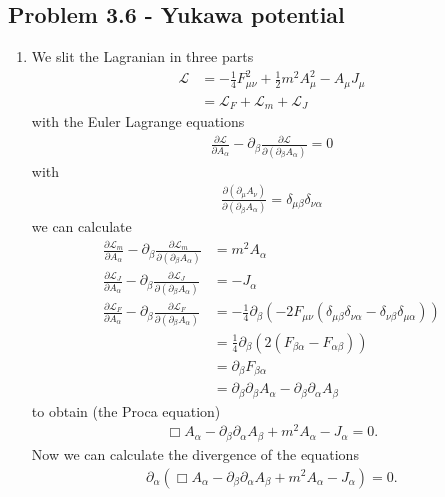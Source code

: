 \documentclass[../main.tex]{subfiles}
\begin{document}
\subsection{Problem 3.6 - Yukawa potential}
\begin{enumerate}[label=(\alph*)]
\item We slit the Lagranian in three parts
\begin{align}
\mathscr{L}&=-\frac{1}{4}F_{\mu\nu}^2+\frac{1}{2}m^2A_\mu^2-A_\mu J_\mu\\
&=\mathscr{L}_F+\mathscr{L}_m+\mathscr{L}_J
\end{align}
with the Euler Lagrange equations
\begin{align}
        \frac{\partial\mathscr{L}}{\partial A_\alpha}-\partial_\beta\frac{\partial\mathscr{L}}{\partial(\partial_\beta A_\alpha)}=0
\end{align}
with
\begin{align}
    \frac{\partial(\partial_\mu A_\nu)}{\partial(\partial_\beta A_\alpha)}=\delta_{\mu\beta}\delta_{\nu\alpha}
\end{align}
we can calculate
\begin{align}
    \frac{\partial\mathscr{L}_m}{\partial A_\alpha}-\partial_\beta\frac{\partial\mathscr{L}_m}{\partial(\partial_\beta A_\alpha)}&=m^2A_\alpha\\
    \frac{\partial\mathscr{L}_J}{\partial A_\alpha}-\partial_\beta\frac{\partial\mathscr{L}_J}{\partial(\partial_\beta A_\alpha)}&=-J_\alpha\\
    \frac{\partial\mathscr{L}_F}{\partial A_\alpha}-\partial_\beta\frac{\partial\mathscr{L}_F}{\partial(\partial_\beta A_\alpha)}&=-\frac{1}{4}\partial_\beta\left(-2F_{\mu\nu}(\delta_{\mu\beta}\delta_{\nu\alpha}-\delta_{\nu\beta}\delta_{\mu\alpha})\right)\\
    &=\frac{1}{4}\partial_\beta\left(2(F_{\beta\alpha}-F_{\alpha\beta})\right)\\
    &=\partial_\beta F_{\beta\alpha}\\
    &=\partial_\beta\partial_\beta A_\alpha-\partial_\beta\partial_\alpha A_\beta
\end{align}
to obtain (the Proca equation)
\begin{align}
    \Box A_\alpha-\partial_\beta\partial_\alpha A_\beta+m^2A_\alpha-J_\alpha=0.
\end{align}
Now we can calculate the divergence of the equations
\begin{align}
    \partial_\alpha\left(\Box A_\alpha-\partial_\beta\partial_\alpha A_\beta+m^2A_\alpha-J_\alpha\right)=0.\\

\end{align}
\end{enumerate}
\end{document}
